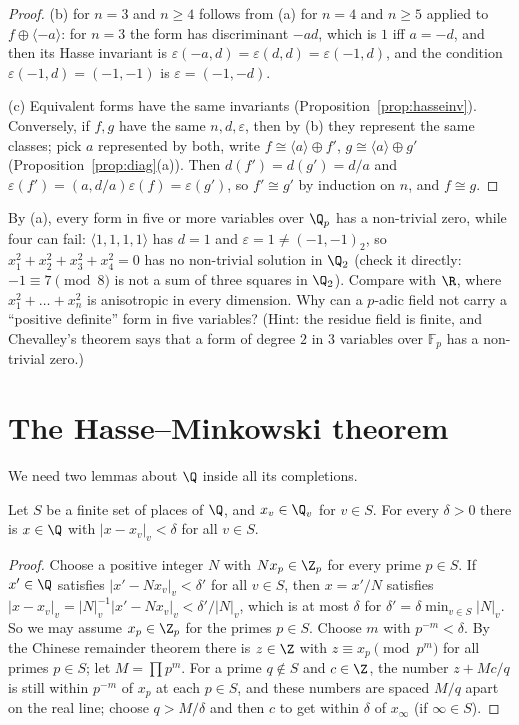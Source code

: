 \begin{proof}
(b) for $n=3$ and $n\ge4$ follows from (a) for $n=4$ and $n\ge5$ applied to $f\oplus\langle-a\rangle$: for $n=3$ the form has
discriminant $-ad$, which is $1$ iff $a=-d$, and then its Hasse invariant is $\varepsilon(-a,d)=\varepsilon(d,d)=\varepsilon(-1,d)$, and the
condition $\varepsilon(-1,d)=(-1,-1)$ is $\varepsilon=(-1,-d)$.

(c) Equivalent forms have the same invariants (Proposition~\ref{prop:hasseinv}). Conversely, if $f,g$ have the same $n,d,\varepsilon$,
then by (b) they represent the same classes; pick $a$ represented by both, write $f\cong\langle a\rangle\oplus f'$,
$g\cong\langle a\rangle\oplus g'$ (Proposition~\ref{prop:diag}(a)). Then $d(f')=d(g')=d/a$ and $\varepsilon(f')=(a,d/a)\varepsilon(f)=
\varepsilon(g')$, so $f'\cong g'$ by induction on $n$, and $f\cong g$.
\end{proof}

\begin{think}
By (a), every form in five or more variables over $\Q_p$ has a non-trivial zero, while four can fail: $\langle1,1,1,1\rangle$ has
$d=1$ and $\varepsilon=1\ne(-1,-1)_2$, so $x_1^2+x_2^2+x_3^2+x_4^2=0$ has no non-trivial solution in $\Q_2$ (check it directly:
$-1\equiv7\pmod 8$ is not a sum of three squares in $\Q_2$). Compare with $\R$, where $x_1^2+\dots+x_n^2$ is anisotropic in every
dimension. Why can a $p$-adic field not carry a ``positive definite'' form in five variables? (Hint: the residue field is
finite, and Chevalley's theorem says that a form of degree $2$ in $3$ variables over $\mathbb F_p$ has a non-trivial zero.)
\end{think}

\section{The Hasse--Minkowski theorem}

We need two lemmas about $\Q$ inside all its completions.

\begin{lemma}[approximation]\label{lem:approx}
Let $S$ be a finite set of places of $\Q$, and $x_v\in\Q_v$ for $v\in S$. For every $\delta>0$ there is $x\in\Q$ with
$|x-x_v|_v<\delta$ for all $v\in S$.
\end{lemma}
\begin{proof}
Choose a positive integer $N$ with $Nx_p\in\Z_p$ for every prime $p\in S$. If $x'\in\Q$ satisfies $|x'-Nx_v|_v<\delta'$ for all
$v\in S$, then $x=x'/N$ satisfies $|x-x_v|_v=|N|_v^{-1}|x'-Nx_v|_v<\delta'/|N|_v$, which is at most $\delta$ for
$\delta'=\delta\min_{v\in S}|N|_v$. So we may assume $x_p\in\Z_p$ for the primes $p\in S$. Choose $m$ with $p^{-m}<\delta$. By the
Chinese remainder theorem there is $z\in\Z$ with $z\equiv x_p\pmod{p^m}$ for all primes $p\in S$; let $M=\prod p^m$. For a prime
$q\notin S$ and $c\in\Z$, the number $z+Mc/q$ is still within $p^{-m}$ of $x_p$ at each $p\in S$, and these numbers are spaced
$M/q$ apart on the real line; choose $q>M/\delta$ and then $c$ to get within $\delta$ of $x_\infty$ (if $\infty\in S$).
\end{proof}

